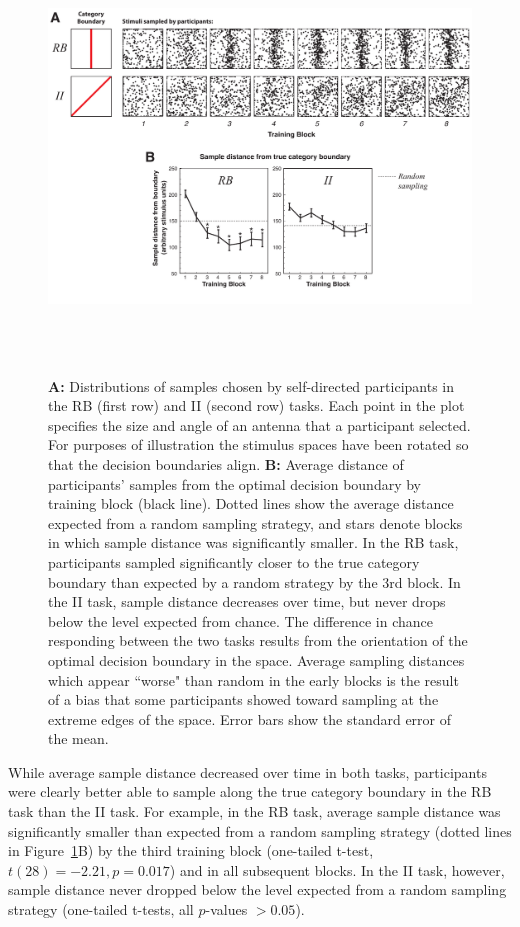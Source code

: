 \documentclass[3p,twocolumn,authoryear,10pt]{elsarticle}
\begin{document}
\begin{figure}[t]
\centerline{\includegraphics[height=4.5in]{figures/sampleplots.pdf}}
\caption{\textbf{A:} Distributions of samples chosen by self-directed participants in the RB (first row) and II (second row) tasks.  Each point in the plot specifies the size and angle of an antenna that a participant selected.  For purposes of illustration the stimulus spaces have been rotated so that the decision boundaries align.   \textbf{B:} Average distance of participants' samples from the optimal decision boundary by training block (black line). Dotted lines show the average distance expected from a random sampling strategy, and stars denote blocks in which sample distance was significantly smaller. In the RB task, participants sampled significantly closer to the true category boundary than expected by a random strategy by the 3rd block. In the II task, sample distance decreases over time, but never drops below the level expected from chance.  The difference in chance responding between the two tasks results from the orientation of the optimal decision boundary in the space.  Average sampling distances which appear ``worse" than random in the early blocks is the result of a bias that some participants showed toward sampling at the extreme edges of the space.  Error bars show the standard error of the mean.}
\label{sampledistance.fig}
\end{figure}


While average sample distance decreased over time in both tasks, participants were clearly better able to sample along the true category boundary in the RB task than the II task. For example, in the RB task, average sample distance was significantly smaller than expected from a random sampling strategy (dotted lines in Figure~\ref{sampledistance.fig}B) by the third training block (one-tailed t-test, $t(28)=-2.21, p=0.017$) and in all subsequent blocks. In the II task, however, sample distance never dropped below the level expected from a random sampling strategy (one-tailed t-tests, all $p$-values $> 0.05$).
\end{document}
